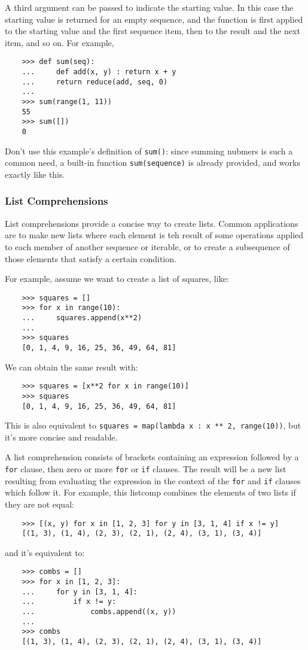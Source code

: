 \documentclass[UTF8]{article}
\begin{document}
A third argument can be passed to indicate the starting value. In this case the starting value is
returned for an empty sequence, and the function is first applied to the starting value and the
first sequence item, then to the result and the next item, and so on. For example,
\begin{verbatim}
    >>> def sum(seq):
    ...     def add(x, y) : return x + y
    ...     return reduce(add, seq, 0)
    ...
    >>> sum(range(1, 11))
    55
    >>> sum([])
    0
\end{verbatim}

Don't use this example's definition of \texttt{sum()}: since summing nubmers is such a common need,
a built-in function \texttt{sum(sequence)} is already provided, and works exactly like this.

\subsubsection{List Comprehensions}
List comprehensions provide a concise way to create lists. Common applications are to make new
lists where each element is teh result of some operations applied to each member of another
sequence or iterable, or to create a subsequence of those elements that satisfy a certain condition.

For example, assume we want to create a list of squares, like:
\begin{verbatim}
    >>> squares = []
    >>> for x in range(10):
    ...     squares.append(x**2)
    ...
    >>> squares
    [0, 1, 4, 9, 16, 25, 36, 49, 64, 81]
\end{verbatim}

We can obtain the same result with:
\begin{verbatim}
    >>> squares = [x**2 for x in range(10)]
    >>> squares
    [0, 1, 4, 9, 16, 25, 36, 49, 64, 81]
\end{verbatim}
This is also equivalent to \texttt{squares = map(lambda x : x ** 2, range(10))}, but
it's more concise and readable.

A list comprehension consists of brackets containing an expression followed by a \texttt{for}
clause, then zero or more \texttt{for} or \texttt{if} clauses. The result will be a new list
resulting from evaluating the expression in the context of the \texttt{for} and \texttt{if} clauses
which follow it. For example, this listcomp combines the elements of two lists if they are not
equal:
\begin{verbatim}
    >>> [(x, y) for x in [1, 2, 3] for y in [3, 1, 4] if x != y]
    [(1, 3), (1, 4), (2, 3), (2, 1), (2, 4), (3, 1), (3, 4)]
\end{verbatim}
and it's equivalent to:
\begin{verbatim}
    >>> combs = []
    >>> for x in [1, 2, 3]:
    ...     for y in [3, 1, 4]:
    ...         if x != y:
    ...             combs.append((x, y))
    ...
    >>> combs
    [(1, 3), (1, 4), (2, 3), (2, 1), (2, 4), (3, 1), (3, 4)]
\end{verbatim}
\end{document}
